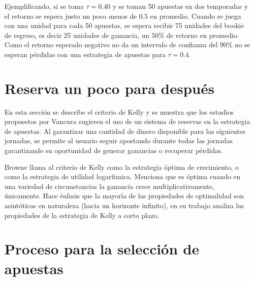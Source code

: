 Ejemplificando, si se toma $\tau = 0.40$ y se toman 50 apuestas en dos temporadas y el retorno se espera justo un poco menos de $0.5$ en promedio. Cuando se juega con una unidad para cada 50 apuestas, se espera recibir 75 unidades del bookie de regreso, es decir 25 unidades de ganancia, un $50\%$ de retorno en promedio. Como el retorno esperado negativo no da un intervalo de confianza del $90\%$ no se esperan pérdidas con una estrategia de apuestas para $\tau = 0.4$.

\section{Reserva un poco para después}
\label{sec:kelly}

En esta sección se describe el criterio de Kelly \cite{kelly1956new} y se muestra que los estudios propuestos por Vancura \cite{vancura2000finding} sugieren el uso de un sistema de reservas en la estrategia de apuestas. Al garantizar una cantidad de dinero disponible para las siguientes jornadas, se permite al usuario seguir apostando durante todas las jornadas garantizando su oportunidad de generar ganancias o recuperar pérdidas.


Browne \cite{browne2000can} llama al criterio de Kelly \cite{kelly1956new} como la estrategia óptima de crecimiento, o como la estrategia de utilidad logarítmica. Menciona que es óptima cuando en una variedad de circunstancias la ganancia crece multiplicativamente, únicamente. Hace énfasis que la mayoría de las propiedades de optimalidad son asintóticas en naturaleza (hacia un horizonte infinito), en su trabajo analiza las propiedades de la estrategia de Kelly a corto plazo.

\cite{kelly1956new}
\cite{vancura2000finding}

 \section{Proceso para la selección de apuestas}

%
%
 
